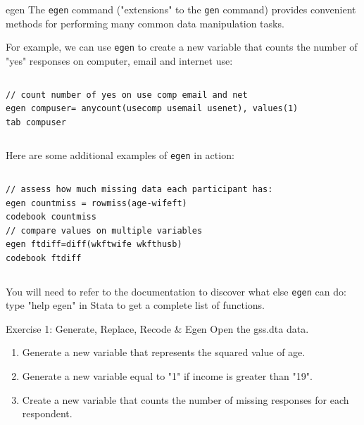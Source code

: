 \documentclass[table,smaller]{beamer}
\begin{document}
\begin{frame}[fragile,label=sec-2-4]{egen}
 The \verb~egen~ command ("extensions" to the \verb~gen~ command) provides convenient methods for performing many common data manipulation tasks.

For example, we can use \verb~egen~ to create a new variable that counts the number of "yes" responses on computer, email and internet use:
\vspace{-.5em} \begin{columns}  \begin{block}{}
\begin{verbatim}
// count number of yes on use comp email and net 
egen compuser= anycount(usecomp usemail usenet), values(1)
tab compuser
\end{verbatim}
\end{block} \end{columns}

Here are some additional examples of \verb~egen~ in action:
\vspace{-.5em} \begin{columns}  \begin{block}{}
\begin{verbatim}
// assess how much missing data each participant has:
egen countmiss = rowmiss(age-wifeft)
codebook countmiss
// compare values on multiple variables
egen ftdiff=diff(wkftwife wkfthusb)
codebook ftdiff
\end{verbatim}
\end{block} \end{columns}


You will need to refer to the documentation to discover what else \verb~egen~ can do: type "help egen" in Stata to get a complete list of functions.
\end{frame}
\begin{frame}[label=sec-2-5]{Exercise 1: Generate, Replace, Recode \& Egen}
Open the gss.dta data.
\begin{enumerate}
\item Generate a new variable that represents the squared value of age.
\item Generate a new variable equal to "1" if income is greater than "19".
\item Create a new variable that counts the number of missing responses for each respondent.
\end{enumerate}
\end{frame}
\end{document}
